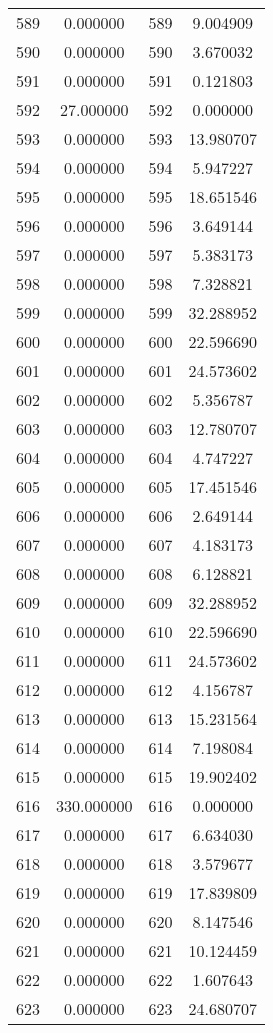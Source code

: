 \documentclass[12pt]{article}
\begin{document}
\begin{longtable}{@{}cccc@{}}
589 & 0.000000 & 589 & 9.004909 \\
590 & 0.000000 & 590 & 3.670032 \\
591 & 0.000000 & 591 & 0.121803 \\
592 & 27.000000 & 592 & 0.000000 \\
593 & 0.000000 & 593 & 13.980707 \\
594 & 0.000000 & 594 & 5.947227 \\
595 & 0.000000 & 595 & 18.651546 \\
596 & 0.000000 & 596 & 3.649144 \\
597 & 0.000000 & 597 & 5.383173 \\
598 & 0.000000 & 598 & 7.328821 \\
599 & 0.000000 & 599 & 32.288952 \\
600 & 0.000000 & 600 & 22.596690 \\
601 & 0.000000 & 601 & 24.573602 \\
602 & 0.000000 & 602 & 5.356787 \\
603 & 0.000000 & 603 & 12.780707 \\
604 & 0.000000 & 604 & 4.747227 \\
605 & 0.000000 & 605 & 17.451546 \\
606 & 0.000000 & 606 & 2.649144 \\
607 & 0.000000 & 607 & 4.183173 \\
608 & 0.000000 & 608 & 6.128821 \\
609 & 0.000000 & 609 & 32.288952 \\
610 & 0.000000 & 610 & 22.596690 \\
611 & 0.000000 & 611 & 24.573602 \\
612 & 0.000000 & 612 & 4.156787 \\
613 & 0.000000 & 613 & 15.231564 \\
614 & 0.000000 & 614 & 7.198084 \\
615 & 0.000000 & 615 & 19.902402 \\
616 & 330.000000 & 616 & 0.000000 \\
617 & 0.000000 & 617 & 6.634030 \\
618 & 0.000000 & 618 & 3.579677 \\
619 & 0.000000 & 619 & 17.839809 \\
620 & 0.000000 & 620 & 8.147546 \\
621 & 0.000000 & 621 & 10.124459 \\
622 & 0.000000 & 622 & 1.607643 \\
623 & 0.000000 & 623 & 24.680707 \\

\end{longtable}
\end{document}
